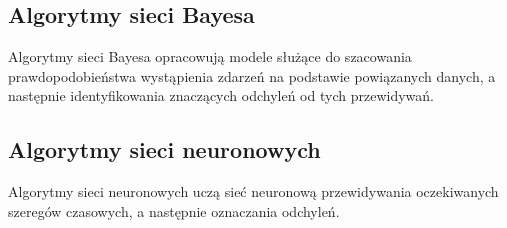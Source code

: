 \documentclass[12pt]{article}
\begin{document}
\subsection{Algorytmy sieci Bayesa}
Algorytmy sieci Bayesa opracowują modele służące do szacowania prawdopodobieństwa wystąpienia zdarzeń na podstawie powiązanych danych, a następnie identyfikowania znaczących odchyleń od tych przewidywań.

\subsection{Algorytmy sieci neuronowych}
Algorytmy sieci neuronowych uczą sieć neuronową przewidywania oczekiwanych szeregów czasowych, a następnie oznaczania odchyleń.




\end{document}
